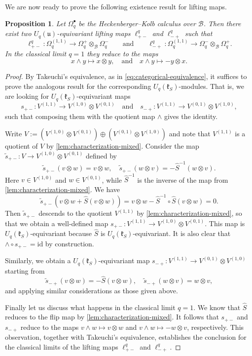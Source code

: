 \documentclass[a4paper,12pt,reqno,english]{amsart}
\numberwithin{equation}{section}
\numberwithin{figure}{section}
\theoremstyle{plain}
\theoremstyle{plain}
\theoremstyle{plain}
\newtheorem{proposition}[theorem]{Proposition}
\theoremstyle{plain}
\theoremstyle{plain}
\theoremstyle{definition}
\theoremstyle{definition}
\theoremstyle{definition}
\theoremstyle{remark}
\theoremstyle{definition}
\newcommand{\Uqu}{U_q(\mathfrak{u})}
\newcommand{\UqkS}{U_q(\mathfrak{k}_S)}
\newcommand{\qalg}{\mathcal{B}}
\newcommand{\id}{\mathrm{id}}
\newcommand{\liftqpm}{\ell^q_{+ -}}
\newcommand{\liftqmp}{\ell^q_{- +}}
\newcommand{\diffcalc}{\Omega_q}
\newcommand{\braidS}{\hat{S}}
\newcommand{\wedgemap}{\mathord{\wedge}}
\begin{document}
We are now ready to prove the following existence result for lifting maps.

\begin{proposition}
\label{prop:lifting-heko}
Let $\diffcalc^\bullet$ be the Heckenberger--Kolb calculus over $\qalg$.
Then there exist two $\Uqu$-equivariant lifting maps $\liftqpm$ and $\liftqmp$ such that
\[
\liftqpm : \diffcalc^{(1, 1)} \to \diffcalc^+ \otimes_\qalg \diffcalc^-
\qquad \textrm{and} \qquad
\liftqmp : \diffcalc^{(1, 1)} \to \diffcalc^- \otimes_\qalg \diffcalc^+.
\]
In the classical limit $q = 1$ they reduce to the maps
\[
x \wedge y \mapsto x \otimes y,
\quad \textrm{and} \quad
x \wedge y \mapsto - y \otimes x.
\]
\end{proposition}

\begin{proof}
By Takeuchi's equivalence, as in \eqref{eq:categorical-equivalence}, it suffices to prove the analogous result for the corresponding $\UqkS$-modules.
That is, we are looking for $\UqkS$-equivariant maps
\[
s_{+ -}: V^{(1, 1)} \to V^{(1, 0)} \otimes V^{(0, 1)}
\quad \textrm{and} \quad
s_{- +}: V^{(1, 1)} \to V^{(0, 1)} \otimes V^{(1, 0)},
\]
such that composing them with the quotient map $\wedgemap$ gives the identity.

Write $V := (V^{(1, 0)} \otimes V^{(0, 1)}) \oplus (V^{(0, 1)} \otimes V^{(1, 0)})$ and note that $V^{(1, 1)}$ is a quotient of $V$ by \cref{lem:characterization-mixed}.
Consider the map $\tilde{s}_{+ -} : V \to V^{(1, 0)} \otimes V^{(0, 1)}$ defined by
\[
\tilde{s}_{+ -}(v \otimes w) = v \otimes w, \quad
\tilde{s}_{+ -}(w \otimes v) = - \braidS^{-1}(w \otimes v).
\]
Here $v \in V^{(1, 0)}$ and $w \in V^{(0, 1)}$, while $\braidS^{-1}$ is the inverse of the map from \cref{lem:characterization-mixed}.
We have
\[
\tilde{s}_{+ -} \left( v \otimes w + \braidS(v \otimes w) \right) = v \otimes w - \braidS^{-1} \circ \braidS(v \otimes w) = 0.
\]
Then $\tilde{s}_{+ -}$ descends to the quotient $V^{(1, 1)}$ by \cref{lem:characterization-mixed}, so that we obtain a well-defined map $s_{+ -} : V^{(1, 1)} \to V^{(1, 0)} \otimes V^{(0, 1)}$.
This map is $\UqkS$-equivariant because $\braidS$ is $\UqkS$-equivariant.
It is also clear that $\wedgemap \circ s_{+ -} = \id$ by construction.

Similarly, we obtain a $\UqkS$-equivariant map $s_{- +} : V^{(1, 1)} \to V^{(0, 1)} \otimes V^{(1, 0)}$ starting from
\[
\tilde{s}_{- +}(v \otimes w) = - \braidS(v \otimes w), \quad
\tilde{s}_{- +}(w \otimes v) = w \otimes v,
\]
and applying similar considerations as those given above.

Finally let us discuss what happens in the classical limit $q = 1$.
We know that $\braidS$ reduces to the flip map by \cref{lem:characterization-mixed}.
It follows that $s_{+ -}$ and $s_{- +}$ reduce to the maps $v \wedge w \mapsto v \otimes w$ and $v \wedge w \mapsto - w \otimes v$, respectively.
This observation, together with Takeuchi's equivalence, establishes the conclusion for the classical limits of the lifting maps $\liftqpm$ and $\liftqmp$.
\end{proof}
\end{document}
